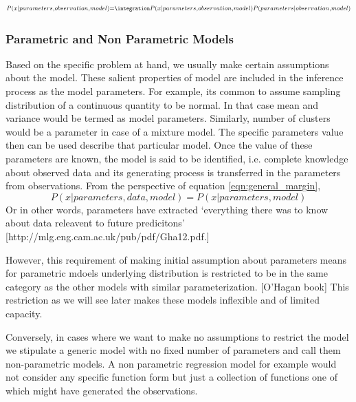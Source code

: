 \begin{equation}
\scriptstyle
    P(x| parameters, observation,model) = \integration P(x | parameters , observation, model) P(parameters |observation, model)
    \label{eqn:general_margin}
\end{equation}

\subsubsection{Parametric and Non Parametric Models}

Based on the specific problem at hand, we usually make certain assumptions about the model. These salient properties of model are included in the inference process as the model parameters. For example, its common to assume sampling distribution of a continuous quantity to be normal. In that case mean and variance would be termed as model parameters. Similarly, number of clusters would be a parameter in case of a mixture model. The specific parameters value then can be used describe that particular model. Once the value of these parameters are known, the model is said to be identified, i.e. complete knowledge about observed data and its generating process is transferred in the parameters from observations. From the perspective of equation \ref{eqn:general_margin}, 
 $$P(x| parameters, data, model) =  P(x| parameters, model)$$
Or in other words, parameters have extracted ‘everything there was to know about data releavent to future predicitons’ [http://mlg.eng.cam.ac.uk/pub/pdf/Gha12.pdf.] 

However, this requirement of making initial assumption about parameters means for parametric mdoels underlying distribution is restricted to be in the same category as the other models with similar parameterization. [O’Hagan book] This restriction as we will see later makes these models inflexible and of limited capacity. 

Conversely, in cases where we want to make no assumptions to restrict the model we stipulate a generic model with no fixed number of parameters and call them non-parametric models. A non parametric regression model for example would not consider any specific function form but just a collection of functions one of which might have generated the observations. 

